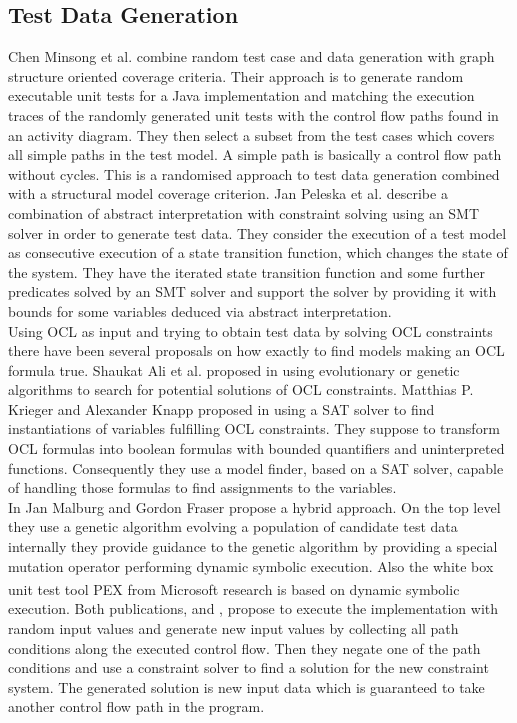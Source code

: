 \subsection{Test Data Generation}
Chen Minsong et al. \cite{mingsong2006automatic} combine random test case and data generation with graph structure oriented coverage criteria. Their approach is to generate random executable unit tests for a Java implementation and matching the execution traces of the randomly generated unit tests with the control flow paths found in an activity diagram. They then select a subset from the test cases which covers all simple paths in the test model. A simple path is basically a control flow path without cycles. This is a randomised approach to test data generation combined with a structural model coverage criterion.
Jan Peleska et al. \cite{peleska2011automated} describe a combination of abstract interpretation with constraint solving using an SMT solver in order to generate test data. They consider the execution of a test model as consecutive execution of a state transition function, which changes the state of the system. They have the iterated state transition function and some further predicates solved by an SMT solver and support the solver by providing it with bounds for some variables deduced via abstract interpretation.\\
Using OCL as input and trying to obtain test data by solving OCL constraints there have been several proposals on how exactly to find models making an OCL formula true. Shaukat Ali et al. proposed in \cite{ali2011search} using evolutionary or genetic algorithms to search for potential solutions of OCL constraints. Matthias P. Krieger and Alexander Knapp proposed in \cite{krieger2008executingUnderspecifiedOCL} using a SAT solver to find instantiations of variables fulfilling OCL constraints. They suppose to transform OCL formulas into boolean formulas with bounded quantifiers and uninterpreted functions. Consequently they use a model finder, based on a SAT solver, capable of handling those formulas to find assignments to the variables.\\
In \cite{malburg2011combining} Jan Malburg and Gordon Fraser propose a hybrid approach. On the top level they use a genetic algorithm evolving a population of candidate test data internally they provide guidance to the genetic algorithm by providing a special mutation operator performing dynamic symbolic execution. Also the white box unit test tool PEX \cite{pex} from Microsoft\textsuperscript{\textregistered} research is based on dynamic symbolic execution. Both publications, \cite{malburg2011combining} and \cite{pex}, propose to execute the implementation with random input values and generate new input values by collecting all path conditions along the executed control flow. Then they negate one of the path conditions and use a constraint solver to find a solution for the new constraint system. The generated solution is new input data which is guaranteed to take another control flow path in the program.\\
